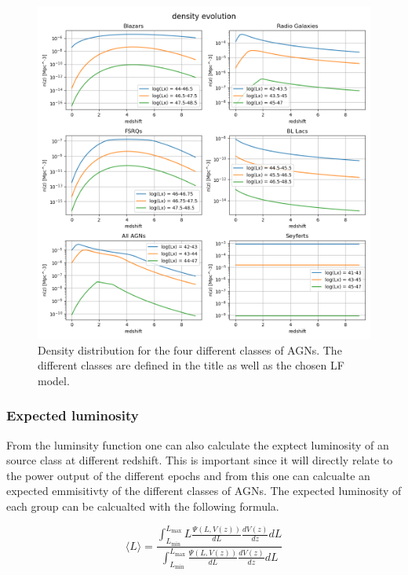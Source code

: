 \documentclass{article}
\begin{document}
\begin{figure}
    \centering
    \includegraphics[width = \textwidth]{new_plots/Redshift density evolution.png}
    \caption{Density distribution for the four different classes of AGNs. The different classes are defined in the title as well as the chosen LF model.}
    \label{fig:DD}
\end{figure}



\subsubsection{Expected luminosity}
From the luminsity function one can also calculate the exptect luminosity of an source class at different redshift. This is important since it will directly relate to the 
power output of the different epochs and from this one can calcualte an expected emmisitivty of the different classes of AGNs. 
The expected luminosity of each group can be calcualted with the following formula. 

\begin{equation}
    \langle L \rangle = \frac{\int_{L_{\text{min}}}^{L_{\text{max}}} L \frac{\Psi(L, V(z))}{dL} \frac{dV(z)}{dz} dL}{\int_{L_{\text{min}}}^{L_{\text{max}}} \frac{\Psi(L, V(z))}{dL} \frac{dV(z)}{dz} dL}
\end{equation}
\end{document}
